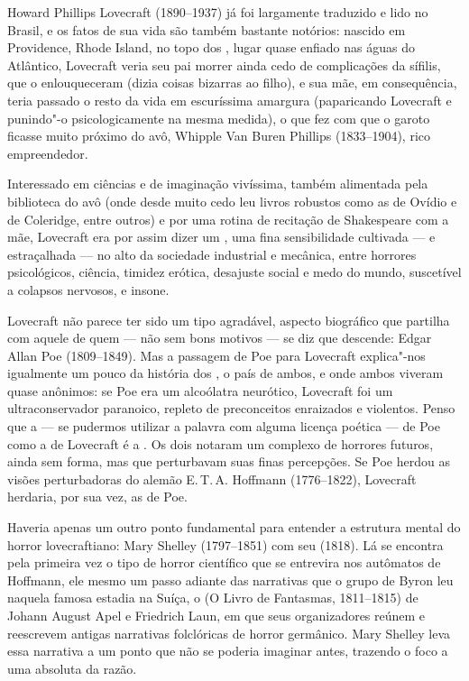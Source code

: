 \begin{multicols}{2}
\noindent{}Howard Phillips Lovecraft (1890--1937) já foi largamente traduzido e lido
no Brasil, e os fatos de sua vida são também bastante notórios: nascido
em Providence, Rhode Island, no topo dos , lugar quase enfiado nas
águas do Atlântico, Lovecraft veria seu pai morrer ainda cedo de
complicações da sífilis, que o enlouqueceram (dizia coisas bizarras ao
filho), e sua mãe, em consequência, teria passado o resto da vida em
escuríssima amargura (paparicando Lovecraft e punindo"-o psicologicamente
na mesma medida), o que fez com que o garoto ficasse muito próximo do
avô, Whipple Van Buren Phillips (1833--1904), rico empreendedor.

Interessado em ciências e de imaginação vivíssima, também alimentada
pela biblioteca do avô (onde desde muito cedo leu livros robustos como
as {} de Ovídio e {} de
Coleridge, entre outros) e por uma rotina de recitação de Shakespeare
com a mãe, Lovecraft era por assim dizer um {},
uma fina sensibilidade cultivada --- e estraçalhada --- no alto da
sociedade industrial e mecânica, entre horrores psicológicos, ciência,
timidez erótica, desajuste social e medo do mundo, suscetível a colapsos
nervosos, e insone.

Lovecraft não parece ter sido um tipo agradável, aspecto biográfico que
partilha com aquele de quem --- não sem bons motivos --- se diz que
descende: Edgar Allan Poe (1809--1849). Mas a passagem de Poe para
Lovecraft explica"-nos igualmente um pouco da história dos , o país de
ambos, e onde ambos viveram quase anônimos: se Poe era um alcoólatra
neurótico, Lovecraft foi um ultraconservador paranoico, repleto de
preconceitos enraizados e violentos. Penso que a {} --- se
pudermos utilizar a palavra com alguma licença poética --- de Poe como a
de Lovecraft é a {}. Os dois notaram um complexo
de horrores futuros, ainda sem forma, mas que perturbavam suas finas
percepções. Se Poe herdou as visões perturbadoras do alemão E.\,T.\,A.
Hoffmann (1776--1822), Lovecraft herdaria, por sua
vez, as de Poe.

Haveria apenas um outro ponto fundamental para entender a estrutura
mental do horror lovecraftiano: Mary Shelley (1797--1851) com seu
{} (1818). Lá se encontra
pela primeira vez o tipo de
horror científico que se entrevira nos autômatos de Hoffmann, ele mesmo
um passo adiante das narrativas que o grupo de Byron leu naquela famosa
estadia na Suíça, o {} (O Livro de Fantasmas, 1811--1815)
de Johann August Apel e Friedrich Laun, em que seus organizadores reúnem
e reescrevem antigas narrativas folclóricas de horror germânico. Mary
Shelley leva essa narrativa a um ponto que não se poderia imaginar
antes, trazendo o foco a uma absoluta {} da razão.


\end{multicols}
